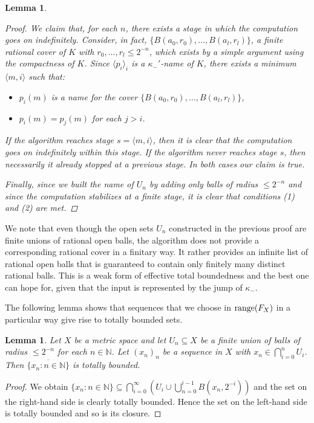 \documentclass[a4paper]{amsart}
\def\IN{{\mathbb{N}}}
\def\In{\subseteq}
\def\range{{\rm range}}
\newtheorem{lemma}[theorem]{Lemma}
\theoremstyle{definition}
\begin{document}
\begin{lemma}
\begin{proof}
We claim that, for each $n$, there exists a stage in which the computation goes on indefinitely.
Consider, in fact, $\{B(a_0,r_0),\dots,B(a_l,r_l)\}$, a finite rational cover of $K$ with $r_0,\dots,r_l\leq 2^{-n}$,
which exists by a simple argument using the compactness of $K$. Since $\langle p_i\rangle_i$ is a $\kappa_-'$-name of $K$,
there exists a minimum $\langle m,i\rangle$ such that:
		\begin{itemize}
			\item $p_i(m)$ is a name for the cover $\{B(a_0,r_0),\dots,B(a_l,r_l)\}$,
			\item $p_i(m)=p_j(m)$ for each $j>i$.
		\end{itemize}
If the algorithm reaches stage $s=\langle m,i\rangle$, then it is clear that the computation goes on indefinitely within this stage.
If the algorithm never reaches stage $s$, then necessarily it already stopped at a previous stage. In both cases our claim is true.

Finally, since we built the name of $U_n$ by adding only balls of radius $\leq 2^{-n}$ and since the computation stabilizes at a finite stage, it is clear that conditions (1) and (2) are met.
	\end{proof}
\end{lemma}

We note that even though the open sets $U_n$ constructed in the previous proof are finite unions of rational open balls,
the algorithm does not provide a corresponding rational cover in a finitary way. It rather provides an infinite list of rational open balls
that is guaranteed to contain only finitely many distinct rational balls.
This is a weak form of effective total boundedness and the best one can hope for, given that the input is represented
by the jump of $\kappa_-$.

The following lemma shows that sequences that we choose in $\range(F_X)$ in a particular way
give rise to totally bounded sets.

\begin{lemma}
\label{lem2}
Let $X$ be a metric space and let $U_n\In X$ be a finite union of balls of radius $\leq 2^{-n}$ for each $n\in\IN$.
Let $(x_n)_n$ be a sequence in $X$ with $x_n\in\bigcap_{i=0}^n U_i$. Then $\overline{\{x_n:n\in\IN\}}$ is totally bounded.
\end{lemma}
\begin{proof}
We obtain  $\{x_n:n\in\IN\}\In\bigcap_{i=0}^\infty\left(U_i\cup\bigcup_{n=0}^{i-1}B(x_n,2^{-i})\right)$ and the
set on the right-hand side is clearly totally bounded. Hence the set on the left-hand side is totally bounded and so is its closure.
\end{proof}
\end{document}
